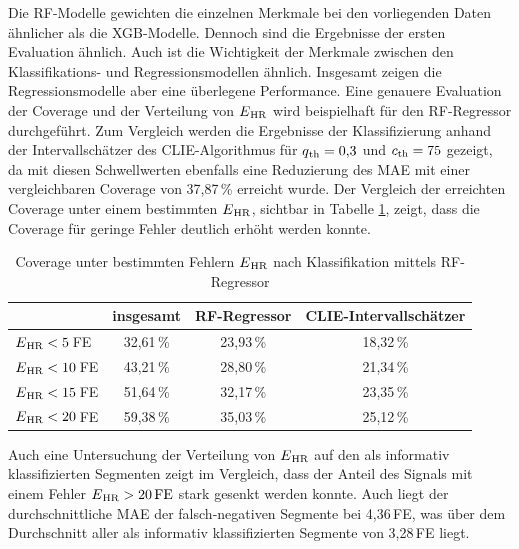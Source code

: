  Die \ac{RF}-Modelle gewichten die einzelnen Merkmale bei den vorliegenden Daten ähnlicher als die \ac{XGB}-Modelle. Dennoch sind die Ergebnisse der ersten Evaluation ähnlich. Auch ist die Wichtigkeit der Merkmale zwischen den Klassifikations- und Regressionsmodellen ähnlich. Insgesamt zeigen die Regressionsmodelle aber eine überlegene Performance. Eine genauere Evaluation der Coverage und der Verteilung von $E\textsubscript{HR}$ wird beispielhaft für den \ac{RF}-Regressor durchgeführt. Zum Vergleich werden die Ergebnisse der Klassifizierung anhand der Intervallschätzer des \ac{CLIE}-Algorithmus für $q\textsubscript{th}=0{,}3$ und $c\textsubscript{th}=75$ gezeigt, da mit diesen Schwellwerten ebenfalls eine Reduzierung des \ac{MAE} mit einer vergleichbaren Coverage von 37,87\,\% erreicht wurde. Der Vergleich der erreichten Coverage unter einem bestimmten $E\textsubscript{HR}$, sichtbar in Tabelle \ref{fig:own-coverage-default}, zeigt, dass die Coverage für geringe Fehler deutlich erhöht werden konnte. 
 
  \begin{table}[h]
 	\centering
  	\begin{tabular}{l || c | c | c}
 											& insgesamt 		& \ac{RF}-Regressor & \ac{CLIE}-Intervallschätzer\\\hline
 		$E\textsubscript{HR} < 5$\,\si{FE} 	&  32{,}61\,\% 	& 23,93\,\% 			& 18,32\,\%\\
 		$E\textsubscript{HR} < 10$\,\si{FE} 	&  43{,}21\,\% 	& 28,80\,\% 			& 21,34\,\%\\
 		$E\textsubscript{HR} < 15$\,\si{FE} 	&  51{,}64\,\% 	& 32,17\,\% 			& 23,35\,\%\\
 		$E\textsubscript{HR} < 20$\,\si{FE} 	&  59{,}38\,\% 	& 35,03\,\% 			& 25,12\,\%\\
 	\end{tabular}
 	\caption[Coverage unter bestimmten Fehlern $E\textsubscript{HR}$ nach Klassifikation mittels \ac{RF}-Regressor]{Coverage unter bestimmten Fehlern $E\textsubscript{HR}$ nach Klassifikation mittels \ac{RF}-Regressor}
 	\label{fig:own-coverage-default}
 \end{table}
 
 Auch eine Untersuchung der Verteilung von $E\textsubscript{HR}$ auf den als informativ klassifizierten Segmenten zeigt im Vergleich, dass der Anteil des Signals mit einem Fehler $E\textsubscript{HR} > 20\,\si{FE}$ stark gesenkt werden konnte. Auch liegt der durchschnittliche \ac{MAE} der falsch-negativen Segmente bei 4,36\,\si{FE}, was über dem Durchschnitt aller als informativ klassifizierten Segmente von 3,28\,\si{FE} liegt.
 
